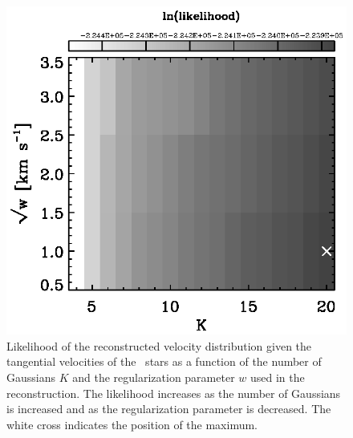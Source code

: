\clearpage
\begin{figure}
\includegraphics{loglike.ps}
\caption{Likelihood of the reconstructed velocity distribution given the tangential velocities of the \Hipparcos\ stars as a function of the number of Gaussians $K$ and the regularization parameter $w$ used in the reconstruction. The likelihood increases as the number of Gaussians is increased and as the regularization parameter is decreased. The white cross indicates the position of the maximum.}%
\label{fig:loglike}
\end{figure}


